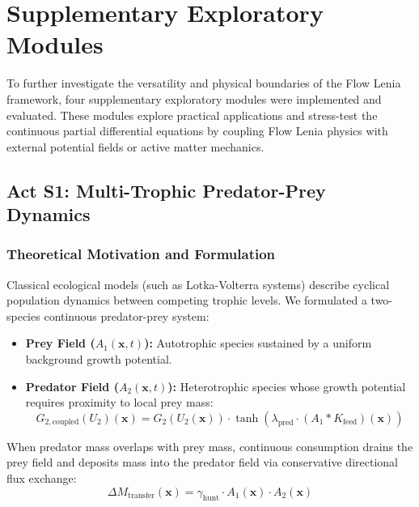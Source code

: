 \section{Supplementary Exploratory Modules}
\label{sec:appendix_supplementary_acts}

To further investigate the versatility and physical boundaries of the Flow Lenia framework, four supplementary exploratory modules were implemented and evaluated. These modules explore practical applications and stress-test the continuous partial differential equations by coupling Flow Lenia physics with external potential fields or active matter mechanics.

\subsection{Act S1: Multi-Trophic Predator-Prey Dynamics}
\label{subsec:app_predator_prey}

\subsubsection{Theoretical Motivation and Formulation}
Classical ecological models (such as Lotka-Volterra systems) describe cyclical population dynamics between competing trophic levels. We formulated a two-species continuous predator-prey system:
\begin{itemize}
    \item \textbf{Prey Field ($A_1(\mathbf{x}, t)$):} Autotrophic species sustained by a uniform background growth potential.
    \item \textbf{Predator Field ($A_2(\mathbf{x}, t)$):} Heterotrophic species whose growth potential requires proximity to local prey mass:
    \begin{equation}
    G_{2, \text{coupled}}(U_2)(\mathbf{x}) = G_2(U_2(\mathbf{x})) \cdot \tanh\left( \lambda_{\text{pred}} \cdot (A_1 * K_{\text{feed}})(\mathbf{x}) \right)
    \label{eq:app_predator_coupling}
    \end{equation}
\end{itemize}

When predator mass overlaps with prey mass, continuous consumption drains the prey field and deposits mass into the predator field via conservative directional flux exchange:
\begin{equation}
\Delta M_{\text{transfer}}(\mathbf{x}) = \gamma_{\text{hunt}} \cdot A_1(\mathbf{x}) \cdot A_2(\mathbf{x})
\label{eq:app_predator_mass_transfer}
\end{equation}

